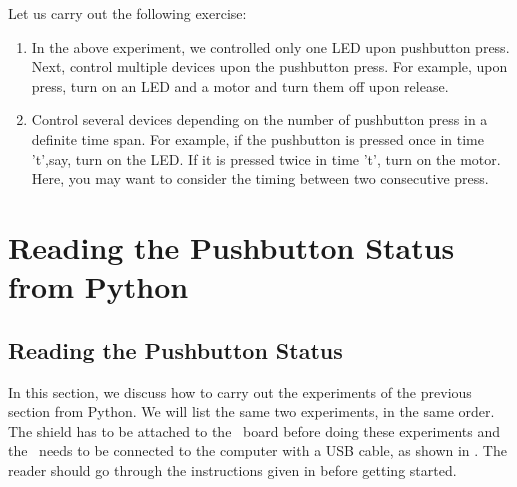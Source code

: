 \begin{exercise}
Let us carry out the following exercise:
\begin{enumerate}
\item In the above experiment, we controlled only one LED upon
  pushbutton press. Next, control multiple devices upon the pushbutton
  press. For example, upon press, turn on an LED and a motor and turn
  them off upon release.
\item Control several devices depending on the number of pushbutton
  press in a definite time span. For example, if the pushbutton is
  pressed once in time 't',say, turn on the LED. If it is pressed
  twice in time 't', turn on the motor. Here, you may want to consider
  the timing between two consecutive press.
\end{enumerate}
\end{exercise}

\section{Reading the Pushbutton Status from Python}
\subsection{Reading the Pushbutton Status}
In this section, we discuss how to carry out the experiments of the
previous section from Python.  We will list the same two experiments,
in the same order.  The shield has to be attached to the \arduino\ board
before doing these experiments and the \arduino\ needs to be connected to the computer 
with a USB cable, as shown in .
The reader should go through the instructions given in
 before getting started.

